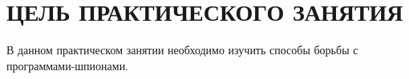 \section{ЦЕЛЬ ПРАКТИЧЕСКОГО ЗАНЯТИЯ}

В данном практическом занятии необходимо изучить способы борьбы с программами-шпионами.


\newpage
